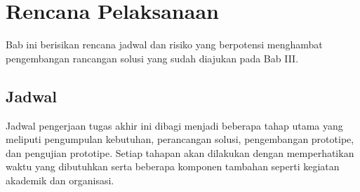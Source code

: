 \chapter{Rencana Pelaksanaan}

Bab ini berisikan rencana jadwal dan risiko yang berpotensi menghambat pengembangan rancangan solusi yang sudah diajukan pada Bab III.





\section{Jadwal}
\label{sec:jadwal}


Jadwal pengerjaan tugas akhir ini dibagi menjadi beberapa tahap utama yang meliputi pengumpulan kebutuhan, perancangan solusi, pengembangan prototipe, dan pengujian prototipe. Setiap tahapan akan dilakukan dengan memperhatikan waktu yang dibutuhkan serta beberapa komponen tambahan seperti kegiatan akademik dan organisasi.

